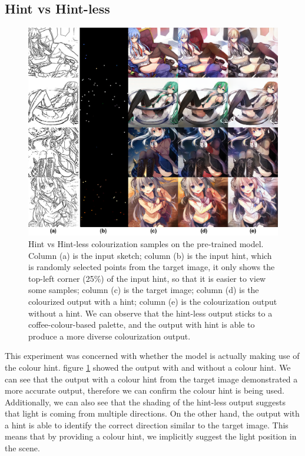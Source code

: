 \subsection{Hint vs Hint-less}
\begin{figure}
    \centering
    \includegraphics[width=1.0\textwidth]{images/colorization/mask_vs_maskless.png}
    \caption{Hint vs Hint-less colourization samples on the pre-trained model. Column (a) is the input sketch; column (b) is the input hint, which is randomly selected points from the target image, it only shows the top-left corner (25\%) of the input hint, so that it is easier to view some samples; column (c) is the  target image; column (d) is the colourized output with a hint; column (e) is the colourization output without a hint. We can observe that the hint-less output sticks to a coffee-colour-based palette, and the output with hint is able to produce a more diverse colourization output.}
    \label{fig:mask_vs_maskless}
\end{figure}


This experiment was concerned with whether the model is actually making use of the colour hint. figure \ref{fig:mask_vs_maskless} showed the output with and without a colour hint. We can see that the output with a colour hint from the target image demonstrated a more accurate output, therefore we can confirm the colour hint is being used. Additionally, we can also see that the shading of the hint-less output suggests that light is coming from multiple directions. On the other hand, the output with a hint is able to identify the correct direction similar to the target image. This means that by providing a colour hint, we implicitly suggest the light position in the scene.

